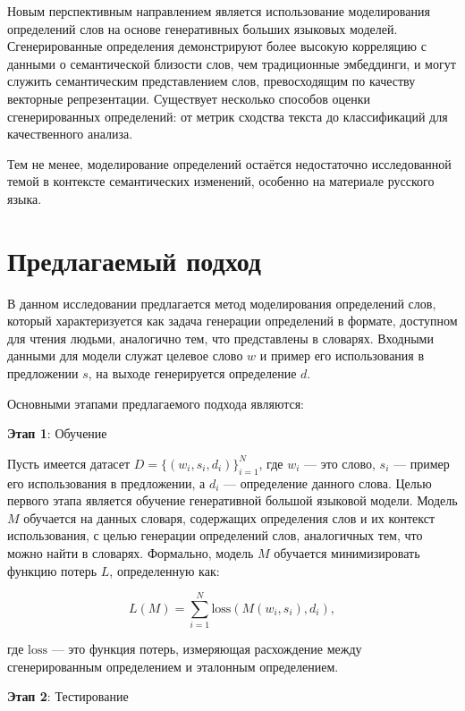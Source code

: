\documentclass[LI,VKR]{HSEUniversity}
\begin{document}
Новым перспективным направлением является использование моделирования определений слов
на основе генеративных больших языковых моделей.
Сгенерированные определения демонстрируют более высокую корреляцию с данными о семантической близости слов,
чем традиционные эмбеддинги, и могут служить семантическим представлением слов,
превосходящим по качеству векторные репрезентации.
Существует несколько способов оценки сгенерированных определений:
от метрик сходства текста до классификаций для качественного анализа.

Тем не менее, моделирование определений остаётся недостаточно исследованной темой
в контексте семантических изменений, особенно на материале русского языка.

\chapter{Предлагаемый подход}


В данном исследовании предлагается метод моделирования определений слов,
который характеризуется как задача генерации определений в формате,
доступном для чтения людьми, аналогично тем, что представлены в словарях.
Входными данными для модели служат целевое слово \( w \) и пример его использования в предложении \( s \),
на выходе генерируется определение \( d \).

Основными этапами предлагаемого подхода являются:

\textbf{Этап 1}: Обучение

Пусть имеется датасет \( D = \{(w_i, s_i, d_i)\}_{i=1}^{N} \),
где \( w_i \) — это слово, \( s_i \) — пример его использования в предложении,
а \( d_i \) — определение данного слова.
Целью первого этапа является обучение генеративной большой языковой модели.
Модель \( M \) обучается на данных словаря, содержащих определения слов и их контекст использования,
с целью генерации определений слов, аналогичных тем, что можно найти в словарях.
Формально, модель \( M \) обучается минимизировать функцию потерь \( L \), определенную как:

\begin{equation}
L(M) = \sum_{i=1}^{N} \text{loss}(M(w_i, s_i), d_i),
\end{equation}

где \(\text{loss}\) — это функция потерь,
измеряющая расхождение между сгенерированным определением и эталонным определением.

\textbf{Этап 2}: Тестирование
\end{document}
